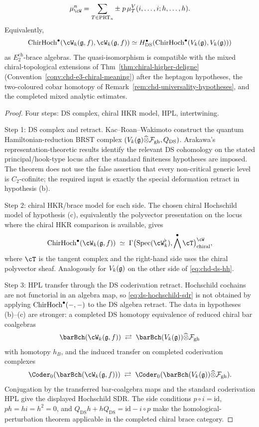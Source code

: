 \begin{theorem}
\begin{equation}
\label{eq:ds-hochschild-hpl-brace}
\mu_{\cW}^{n}
=
\sum_{T\in\mathrm{PRT}_n}
\pm\;
p\,\mu^V_T(i,\ldots,i;h,\ldots,h).
\end{equation}
Equivalently,
\[
\ChirHoch^\bullet(\cW_k(\fg,f),\cW_k(\fg,f))
\simeq
H^\bullet_{\mathrm{DS}}\!
\left(\ChirHoch^\bullet(V_k(\fg),V_k(\fg))\right)
\]
as \(E_2^{\mathrm{ch}}\)-brace algebras.  The quasi-isomorphism
is compatible with the mixed chiral-topological extensions of
Thm~\ref{thm:chiral-higher-deligne}
(Convention~\ref{conv:chd-e3-chiral-meaning}) after the heptagon
hypotheses, the two-coloured cobar homotopy of
Remark~\ref{rem:chd-universality-hypotheses}, and the completed mixed
analytic estimates.
\end{theorem}

\begin{proof}
Four steps: DS complex, chiral HKR model, HPL, intertwining.

Step 1: DS complex and retract. Kac--Roan--Wakimoto construct the
quantum Hamiltonian-reduction BRST complex
\((V_k(\mathfrak{g})\widehat\otimes\mathcal{F}_{\mathrm{gh}},Q_{\mathrm{DS}})\).
Arakawa's representation-theoretic results identify the relevant
DS cohomology on the stated principal/hook-type locus after the
standard finiteness hypotheses are imposed.  The theorem does not use
the false assertion that every non-critical generic level is
\(C_2\)-cofinite; the required input is exactly the special
deformation retract in hypothesis \textup{(b)}.

Step 2: chiral HKR/brace model for each side. The chosen chiral
Hochschild model of hypothesis \textup{(c)}, equivalently the
polyvector presentation on the locus where the chiral HKR comparison is
available, gives
\[
 \ChirHoch^\bullet(\cW_k(\fg, f)) \;\simeq\;
 \Gamma\bigl(\operatorname{Spec}(\cW_k^\flat), \bigwedge^\bullet \cT\bigr)^{\cW}_{\mathrm{chiral}},
\]
where $\cT$ is the tangent complex and the right-hand side uses the
chiral polyvector sheaf. Analogously for $V_k(\mathfrak{g})$ on the other side
of \eqref{eq:chd-ds-hh}.

Step 3: HPL transfer through the DS coderivation retract. Hochschild
cochains are not functorial in an algebra map, so
\eqref{eq:ds-hochschild-sdr} is not obtained by applying
\(\mathrm{ChirHoch}^\bullet(-,-)\) to the DS algebra retract.  The data in
hypotheses \textup{(b)}--\textup{(c)} are stronger: a completed
DS homotopy equivalence of reduced chiral bar coalgebras
\[
\barBch(\cW_k(\fg,f))
\;\rightleftarrows\;
\barBch(V_k(\fg))\widehat\otimes\cF_{\mathrm{gh}}
\]
with homotopy \(h_B\), and the induced transfer on completed
coderivation complexes
\[
\Coder_0(\barBch(\cW_k(\fg,f)))
\;\rightleftarrows\;
\Coder_0(\barBch(V_k(\fg))\widehat\otimes\cF_{\mathrm{gh}}).
\]
Conjugation by the transferred bar-coalgebra maps and the standard
coderivation HPL give the displayed Hochschild SDR.  The side
conditions \(p\circ i=\mathrm{id}\), \(ph=hi=h^2=0\), and
\(Q_{\mathrm{DS}}h+hQ_{\mathrm{DS}}=\mathrm{id}-i\circ p\) make the
homological-perturbation theorem applicable in the completed chiral
brace category.


\end{proof}
